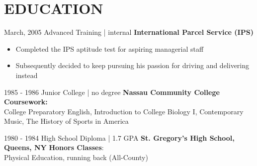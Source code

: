 \documentclass[]{friggeri-cv-theme}
\begin{document}
\section{EDUCATION}
\begin{entrylist}
 
   \entry
    {March, 2005\enspace}
    {Advanced Training | }{\small{internal}}
    {\normalsize\textbf{\color{ipsgreen}\faMapMarker\space International Parcel Service (IPS)}}
    {\jobspace
    \begin{itemize}[leftmargin=*, itemsep = 0.1em]
    \item Completed the IPS aptitude test for aspiring managerial staff
    \item Subsequently decided to keep pursuing his passion for driving and delivering instead\\
    \end{itemize}}
    
  \entry
    {1985 - 1986\enspace}
    {Junior College | }{\small{no degree}}
    {\normalsize\textbf{\color{ipsgreen}\faMapMarker\space Nassau Community College}}
    {\textbf{Coursework:} \\College Preparatory English, Introduction to College Biology I, Contemporary Music, The History of Sports in America
    \eduspace\\}

  \entry
    {1980 - 1984\enspace}
    {High School Diploma | } {\Large\diameter\thinspace\normalsize 1.7 GPA}
    {\normalsize\textbf{\color{ipsgreen}\faMapMarker\space St. Gregory's High School, Queens, NY}
    }
    {\textbf{Honors Classes}: \\Physical Education, running back (All-County)}\vspace{-2.8mm}
\end{entrylist}
\end{document}
